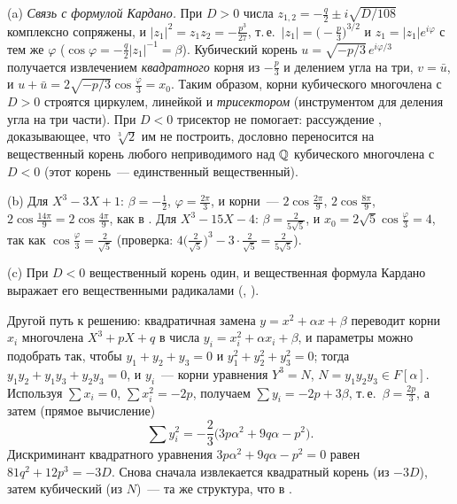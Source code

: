 \begin{remark}[4.7h]
(a) \emph{Связь с формулой Кардано.} При $D>0$ числа $z_{1,2}=-\frac q2\pm i\sqrt{D/108}$ комплексно сопряжены, и
$|z_1|^2=z_1z_2=-\frac{p^3}{27}$, т.\,е.\ $|z_1|=\bigl(-\frac p3\bigr)^{3/2}$ и $z_1=|z_1|e^{i\varphi}$ с тем же $\varphi$
($\cos\varphi=-\frac q2|z_1|^{-1}=\beta$). Кубический корень $u=\sqrt{-p/3}\,e^{i\varphi/3}$ получается извлечением \emph{квадратного} корня
из $-\frac p3$ и делением угла на три, $v=\bar u$, и $u+\bar u=2\sqrt{-p/3}\cos\frac\varphi3=x_0$. Таким образом, корни кубического
многочлена с $D>0$ строятся циркулем, линейкой и \emph{трисектором} (инструментом для деления угла на три части).
При $D<0$ трисектор не помогает: рассуждение , доказывающее, что $\sqrt[3]2$ им не построить, дословно
переносится на вещественный корень любого неприводимого над $\mathbb Q$ кубического многочлена с $D<0$ (этот корень~--- единственный
вещественный).

(b) Для $X^3-3X+1$: $\beta=-\frac12$, $\varphi=\frac{2\pi}3$, и корни~--- $2\cos\frac{2\pi}9$, $2\cos\frac{8\pi}9$, $2\cos\frac{14\pi}9=2\cos\frac{4\pi}9$, как
в . Для $X^3-15X-4$: $\beta=\frac2{5\sqrt5}$, и $x_0=2\sqrt5\cos\frac\varphi3=4$, так как $\cos\frac\varphi3=\frac2{\sqrt5}$ (проверка:
$4\bigl(\frac2{\sqrt5}\bigr)^3-3\cdot\frac2{\sqrt5}=\frac2{5\sqrt5}$).

(c) При $D<0$ вещественный корень один, и вещественная формула Кардано выражает его вещественными радикалами
(, ).
\end{remark}

\begin{aside}
Другой путь к решению: квадратичная замена $y=x^2+\alpha x+\beta$ переводит корни $x_i$ многочлена $X^3+pX+q$ в числа
$y_i=x_i^2+\alpha x_i+\beta$, и параметры можно подобрать так, чтобы $y_1+y_2+y_3=0$ и $y_1^2+y_2^2+y_3^2=0$; тогда
$y_1y_2+y_1y_3+y_2y_3=0$, и $y_i$~--- корни уравнения $Y^3=N$, $N=y_1y_2y_3\in F[\alpha]$. Используя $\sum x_i=0$, $\sum x_i^2=-2p$,
получаем $\sum y_i=-2p+3\beta$, т.\,е.\ $\beta=\frac{2p}3$, а затем (прямое вычисление)
\[
\textstyle\sum y_i^2=-\frac23\bigl(3p\alpha^2+9q\alpha-p^2\bigr).
\]
Дискриминант квадратного уравнения $3p\alpha^2+9q\alpha-p^2=0$ равен $81q^2+12p^3=-3D$. Снова сначала извлекается квадратный
корень (из $-3D$), затем кубический (из $N$)~--- та же структура, что в .
\end{aside}
